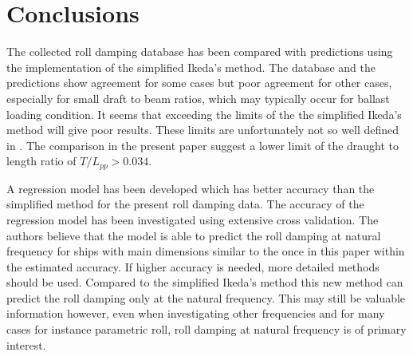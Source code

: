 \section{Conclusions}
\label{se:conclusions}
The collected roll damping database has been compared with predictions using the implementation of the simplified Ikeda's method. The database and the predictions show agreement for some cases but poor agreement for other cases, especially for small draft to beam ratios, which may typically occur for ballast loading condition. It seems that exceeding the limits of the the simplified Ikeda's method will give poor results. These limits are unfortunately not so well defined in \parencite{kawahara_simple_2011}. The comparison in the present paper suggest a lower limit of the draught to length ratio of $T/L_{pp}>0.034$.

A regression model has been developed which has better accuracy than the simplified method for the present roll damping data. The accuracy of the regression model has been investigated using extensive cross validation. The authors believe that the model is able to predict the roll damping at natural frequency for ships with main dimensions similar to the once in this paper within the estimated accuracy. If higher accuracy is needed, more detailed methods should be used. Compared to the simplified Ikeda's method this new method can predict the roll damping only at the natural frequency. This may still be valuable information however, even when investigating other frequencies and for many cases for instance parametric roll, roll damping at natural frequency is of primary interest.

